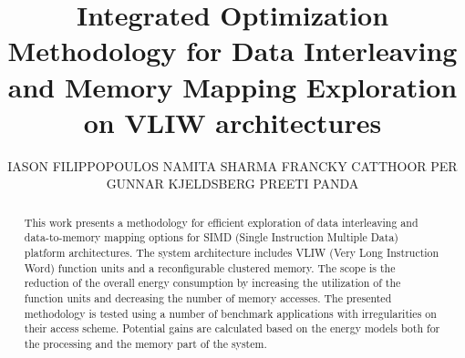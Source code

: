 \documentclass[prodmode,acmtodaes]{acmsmall}
\begin{document}

\title{Integrated Optimization Methodology for Data Interleaving and Memory Mapping Exploration on VLIW architectures}
\author{IASON FILIPPOPOULOS
NAMITA SHARMA 
FRANCKY CATTHOOR
PER GUNNAR KJELDSBERG
PREETI PANDA
}

\begin{abstract}
This work presents a methodology for efficient exploration of data interleaving and data-to-memory mapping options for SIMD (Single Instruction Multiple Data) platform architectures.
The system architecture includes VLIW (Very Long Instruction Word) function units and a reconfigurable clustered memory. 
The scope is the reduction of the overall energy consumption by increasing the utilization of the function units and decreasing the number of memory accesses.
The presented methodology is tested using a number of benchmark applications with irregularities on their access scheme.
Potential gains are calculated based on the energy models both for the processing and the memory part of the system.
\end{abstract}





\end{document}
